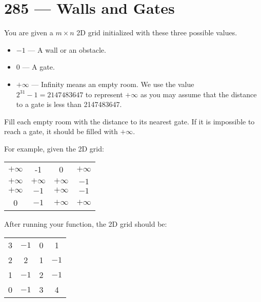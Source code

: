 \section{285 --- Walls and Gates}
You are given a $m \times n$ 2D grid initialized with these three possible values.
\begin{itemize}
\item $-1$  ---  A wall or an obstacle.
\item $0$ --- A gate.
\item $+\infty$ --- Infinity means an empty room. We use the value $2^{31} - 1 = 2147483647$ to represent $+\infty$ as you may assume that the distance to a gate is less than 2147483647.
\end{itemize}
Fill each empty room with the distance to its nearest gate. If it is impossible to reach a gate, it should be filled with $+\infty$.
\par
For example, given the 2D grid:
\begin{table}[H]
\begin{tabular}{cccc}
$+\infty$ & -1 & 0 & $+\infty$\\
$+\infty$ & $+\infty$ & $+\infty$ & $-1$\\
$+\infty$ &  $-1$ & $+\infty$ & $-1$\\
0 & $-1$ & $+\infty$ & $+\infty$
\end{tabular}
\end{table}

After running your function, the 2D grid should be:

\begin{table}[H]
\begin{tabular}{cccc}
  3 & $-1$ &  0 &  1\\
  2 &  2 &  1 & $-1$\\
  1 & $-1$ &  2 & $-1$\\
  0 & $-1$ &  3 &  4
\end{tabular}
\end{table}
